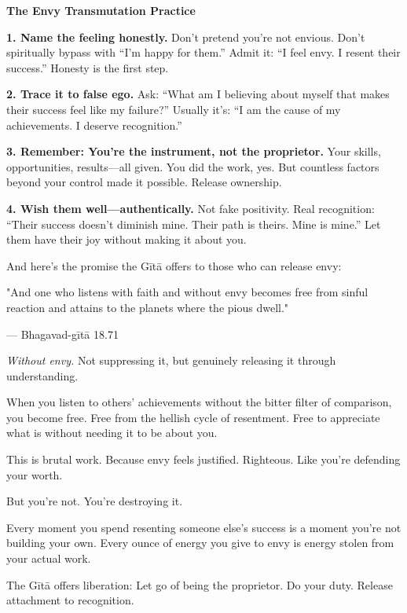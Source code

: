 \documentclass[11pt,twoside]{book}
\begin{document}
\begin{practicebox}
\textbf{The Envy Transmutation Practice}

\textbf{1. Name the feeling honestly.}
Don't pretend you're not envious. Don't spiritually bypass with ``I'm happy for them.'' Admit it: ``I feel envy. I resent their success.'' Honesty is the first step.

\textbf{2. Trace it to false ego.}
Ask: ``What am I believing about myself that makes their success feel like my failure?'' Usually it's: ``I am the cause of my achievements. I deserve recognition.''

\textbf{3. Remember: You're the instrument, not the proprietor.}
Your skills, opportunities, results—all given. You did the work, yes. But countless factors beyond your control made it possible. Release ownership.

\textbf{4. Wish them well—authentically.}
Not fake positivity. Real recognition: ``Their success doesn't diminish mine. Their path is theirs. Mine is mine.'' Let them have their joy without making it about you.
\end{practicebox}

And here's the promise the Gītā offers to those who can release envy:

\begin{pullquote}
"And one who listens with faith and without envy becomes free from sinful reaction and attains to the planets where the pious dwell."

--- Bhagavad-gītā 18.71
\end{pullquote}

\emph{Without envy.} Not suppressing it, but genuinely releasing it through understanding.

When you listen to others' achievements without the bitter filter of comparison, you become free. Free from the hellish cycle of resentment. Free to appreciate what is without needing it to be about you.

This is brutal work. Because envy feels justified. Righteous. Like you're defending your worth.

But you're not. You're destroying it.

Every moment you spend resenting someone else's success is a moment you're not building your own. Every ounce of energy you give to envy is energy stolen from your actual work.

The Gītā offers liberation: Let go of being the proprietor. Do your duty. Release attachment to recognition.
\end{document}
